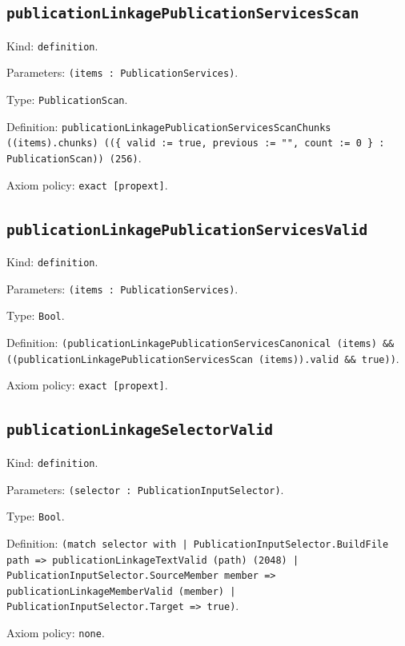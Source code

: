 \documentclass[11pt]{article}
\begin{document}
\subsection*{\texttt{publicationLinkagePublicationServicesScan}}
\noindent Kind: \texttt{definition}.\par
\noindent Parameters: \texttt{(items : PublicationServices)}.\par
\noindent Type: \texttt{PublicationScan}.\par
\noindent Definition: \texttt{publicationLinkagePublicationServicesScanChunks ((items).chunks) ((\{ valid := true, previous := "", count := 0 \} : PublicationScan)) (256)}.\par
\noindent Axiom policy: \texttt{exact [propext]}.\par
\subsection*{\texttt{publicationLinkagePublicationServicesValid}}
\noindent Kind: \texttt{definition}.\par
\noindent Parameters: \texttt{(items : PublicationServices)}.\par
\noindent Type: \texttt{Bool}.\par
\noindent Definition: \texttt{(publicationLinkagePublicationServicesCanonical (items) \&\& ((publicationLinkagePublicationServicesScan (items)).valid \&\& true))}.\par
\noindent Axiom policy: \texttt{exact [propext]}.\par
\subsection*{\texttt{publicationLinkageSelectorValid}}
\noindent Kind: \texttt{definition}.\par
\noindent Parameters: \texttt{(selector : PublicationInputSelector)}.\par
\noindent Type: \texttt{Bool}.\par
\noindent Definition: \texttt{(match selector with | PublicationInputSelector.BuildFile path => publicationLinkageTextValid (path) (2048) | PublicationInputSelector.SourceMember member => publicationLinkageMemberValid (member) | PublicationInputSelector.Target => true)}.\par
\noindent Axiom policy: \texttt{none}.\par
\end{document}
